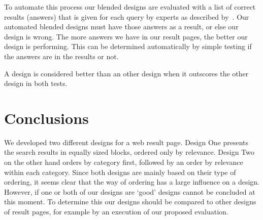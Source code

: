 \documentclass[12pt]{article}
\begin{document}
To automate this process our blended designs are evaluated with a list of correct results (answers) that is given for each query by experts as described by~\cite{lalmas2011aggregated}. Our automated blended designs must have those answers as a result, or else our design is wrong. 
The more answers we have in our result pages, the better our design is performing.
This can be determined automatically by simple testing if the answers are in the results or not.

A design is considered better than an other design when it outscores the other design in both tests.

\section{Conclusions}
\label{sec:conclusion}
We developed two different designs for a web result page.
Design One presents the search results in equally sized blocks, ordered only by relevance.
Design Two on the other hand orders by category first, followed by an order by relevance within each category.
Since both designs are mainly based on their type of ordering, it seems clear that the way of ordering has a large influence on a design.
However, if one or both of our designs are `good' designs cannot be concluded at this moment.
To determine this our designs should be compared to other designs of result pages, for example by an execution of our proposed evaluation.





\appendix

\end{document}
